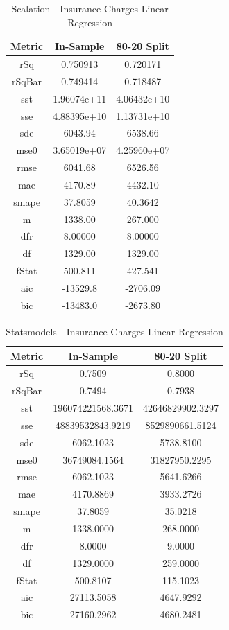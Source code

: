 \documentclass{article}
\begin{document}
\begin{table}[H]
\centering
\caption{Scalation - Insurance Charges Linear Regression}
\label{tab:Scalation - Insurance Charges Linear Regression}
\begin{tabular}{|c|c|c|} \hline 
Metric & In-Sample & 80-20 Split \\ \hline \hline 
rSq &0.750913 & 0.720171 \\ \hline 
rSqBar &0.749414 &      0.718487 \\ \hline 
sst &1.96074e+11 &      4.06432e+10 \\ \hline 
sse &4.88395e+10 &      1.13731e+10 \\ \hline 
sde &6043.94 &  6538.66 \\ \hline 
mse0 &3.65019e+07 &     4.25960e+07 \\ \hline 
rmse &6041.68 & 6526.56 \\ \hline 
mae &4170.89 &  4432.10 \\ \hline 
smape &37.8059 &        40.3642 \\ \hline 
m &1338.00 &    267.000 \\ \hline 
dfr &8.00000 &  8.00000 \\ \hline 
df &1329.00 &   1329.00 \\ \hline 
fStat &500.811 &        427.541 \\ \hline 
aic &-13529.8 & -2706.09 \\ \hline 
bic &-13483.0 & -2673.80 \\ \hline 
\end{tabular}
\end{table}

\begin{table}[H]
\centering
\caption{Statsmodels - Insurance Charges Linear Regression}
\label{tab:Statsmodels - Insurance Charges Linear Regression}
\begin{tabular}{|c|c|c|}\hline
Metric & In-Sample & 80-20 Split \\ \hline \hline
rSq & 0.7509 & 0.8000 \\ \hline
rSqBar & 0.7494 & 0.7938 \\ \hline
sst & 196074221568.3671 & 42646829902.3297 \\ \hline
sse & 48839532843.9219 & 8529890661.5124 \\ \hline
sde & 6062.1023 & 5738.8100 \\ \hline
mse0 & 36749084.1564 & 31827950.2295 \\ \hline
rmse & 6062.1023 & 5641.6266 \\ \hline
mae & 4170.8869 & 3933.2726 \\ \hline
smape & 37.8059 & 35.0218 \\ \hline
m & 1338.0000 & 268.0000 \\ \hline
dfr & 8.0000 & 9.0000 \\ \hline
df & 1329.0000 & 259.0000 \\ \hline
fStat & 500.8107 & 115.1023 \\ \hline
aic & 27113.5058 & 4647.9292 \\ \hline
bic & 27160.2962 & 4680.2481 \\ \hline
\end{tabular}
\end{table}
\end{document}
